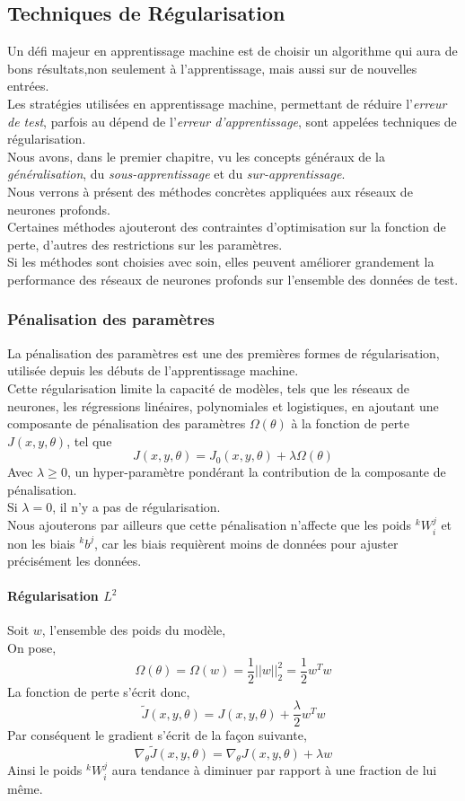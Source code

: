 \documentclass[10pt,a4paper]{report}
\newcommand{\lexp}[1]{\phantom{}^{#1}}
\newcommand{\elem}[4]{\lexp{#2}#1^{#3}_{#4}}
\begin{document}
		\subsection{Techniques de Régularisation}
		Un défi majeur en apprentissage machine est de choisir un algorithme qui aura de bons résultats,non seulement à l'apprentissage, mais aussi sur de nouvelles entrées.\\
		Les stratégies utilisées en apprentissage machine, permettant de réduire l'\emph{erreur de test}, parfois au dépend de l'\emph{erreur d'apprentissage}, sont appelées techniques de régularisation.\\
		Nous avons, dans le premier chapitre, vu les concepts généraux de la \emph{généralisation}, du \emph{sous-apprentissage} et du \emph{sur-apprentissage}.\\
		Nous verrons à présent des méthodes concrètes appliquées aux réseaux de neurones profonds.\\
		Certaines méthodes ajouteront des contraintes d'optimisation sur la fonction de perte, d'autres des restrictions sur les paramètres.\\
		Si les méthodes sont choisies avec soin, elles peuvent améliorer grandement la performance des réseaux de neurones profonds sur l'ensemble des données de test.
			\subsubsection{Pénalisation des paramètres}
			La pénalisation des paramètres est une des premières formes de régularisation, utilisée depuis les débuts de l'apprentissage machine.\\
			Cette régularisation limite la capacité de modèles, tels que les réseaux de neurones, les régressions linéaires, polynomiales et logistiques, en ajoutant une composante de pénalisation des paramètres $\Omega(\theta)$ à la fonction de perte $J(x,y,\theta)$, tel que
			$$J(x,y,\theta) = J_0(x,y,\theta) + \lambda \Omega(\theta)$$
			Avec $\lambda \geq 0$, un hyper-paramètre pondérant la contribution de la composante de pénalisation.\\
			Si $\lambda = 0$, il n'y a pas de régularisation.\\
			Nous ajouterons par ailleurs que cette pénalisation n'affecte que les poids $\elem{W}{k}{j}{i}$ et non les biais $\elem{b}{k}{j}{}$, car les biais requièrent moins de données pour ajuster précisément les données.\\
				\paragraph{Régularisation $L^2$}
				Soit $w$, l'ensemble des poids du modèle,\\
				On pose, $$\Omega(\theta) = \Omega(w) = \frac{1}{2} ||w||_2^2 = \frac{1}{2} w^T w$$
				La fonction de perte s'écrit donc,
				$$\tilde{J}(x,y,\theta) = J(x,y,\theta) + \frac{\lambda}{2} w^T w$$
				Par conséquent le gradient s'écrit de la façon suivante,
				$$\nabla_\theta \tilde{J}(x,y,\theta) = \nabla_\theta J(x,y,\theta) + \lambda w$$
				Ainsi le poids $\elem{W}{k}{j}{i}$ aura tendance à diminuer par rapport à une fraction de lui même.
\end{document}
